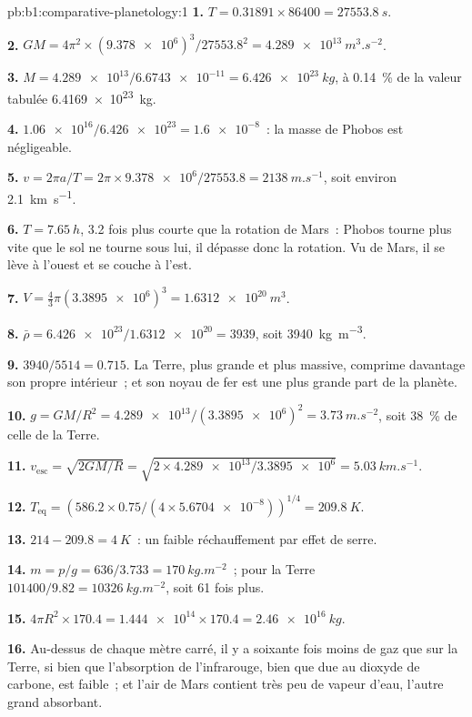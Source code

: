 \begin{solution}{pb:b1:comparative-planetology:1}
\textbf{1.} $T = 0.31891\times86400 = \qty{27553.8}{s}$.

\textbf{2.} $GM = 4\pi^2\times(\num{9.378e6})^3/\num{27553.8}^2 =
\qty{4.289e13}{m^3.s^{-2}}$.

\textbf{3.} $M = \num{4.289e13}/\num{6.6743e-11} = \qty{6.426e23}{kg}$,
à \qty{0.14}{\percent} de la valeur tabulée \qty{6.4169e23}{kg}.

\textbf{4.} $\num{1.06e16}/\num{6.426e23} = \num{1.6e-8}$~: la masse de Phobos
est négligeable.

\textbf{5.} $v = 2\pi a/T = 2\pi\times\num{9.378e6}/27553.8 =
\qty{2138}{m.s^{-1}}$, soit environ \qty{2.1}{km.s^{-1}}.

\textbf{6.} $T = \qty{7.65}{h}$, 3.2 fois plus courte que la rotation de Mars~:
Phobos tourne plus vite que le sol ne tourne sous lui, il dépasse donc la
rotation. Vu de Mars, il se lève à l'ouest et se couche à l'est.

\textbf{7.} $V = \tfrac43\pi(\num{3.3895e6})^3 = \qty{1.6312e20}{m^3}$.

\textbf{8.} $\bar\rho = \num{6.426e23}/\num{1.6312e20} = 3939$, soit
\qty{3940}{kg.m^{-3}}.

\textbf{9.} $3940/5514 = 0.715$. La Terre, plus grande et plus massive,
comprime davantage son propre intérieur~; et son noyau de fer est une plus
grande part de la planète.

\textbf{10.} $g = GM/R^2 = \num{4.289e13}/(\num{3.3895e6})^2 =
\qty{3.73}{m.s^{-2}}$, soit \qty{38}{\percent} de celle de la Terre.

\textbf{11.} $v_\mathrm{esc} = \sqrt{2GM/R} = \sqrt{2\times\num{4.289e13}/
\num{3.3895e6}} = \qty{5.03}{km.s^{-1}}$.

\textbf{12.} $T_\mathrm{eq} = (586.2\times0.75/(4\times\num{5.6704e-8}))^{1/4}
= \qty{209.8}{K}$.

\textbf{13.} $214 - 209.8 = \qty{4}{K}$~: un faible réchauffement par effet de serre.

\textbf{14.} $m = p/g = 636/3.733 = \qty{170}{kg.m^{-2}}$~; pour la Terre
$101400/9.82 = \qty{10326}{kg.m^{-2}}$, soit 61 fois plus.

\textbf{15.} $4\pi R^2\times170.4 = \num{1.444e14}\times170.4 =
\qty{2.46e16}{kg}$.

\textbf{16.} Au-dessus de chaque mètre carré, il y a soixante fois moins de gaz
que sur la Terre, si bien que l'absorption de l'infrarouge, bien que due au
dioxyde de carbone, est faible~; et l'air de Mars contient très peu de vapeur
d'eau, l'autre grand absorbant.


\end{solution}
